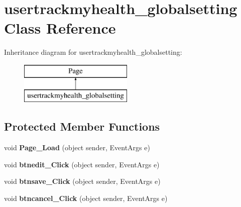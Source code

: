 \hypertarget{classusertrackmyhealth__globalsetting}{\section{usertrackmyhealth\-\_\-globalsetting Class Reference}
\label{classusertrackmyhealth__globalsetting}
}
Inheritance diagram for usertrackmyhealth\-\_\-globalsetting\-:\begin{figure}[H]
\begin{center}
\leavevmode
\includegraphics[height=2.000000cm]{classusertrackmyhealth__globalsetting}
\end{center}
\end{figure}
\subsection*{Protected Member Functions}
\begin{DoxyCompactItemize}
\item 
\hypertarget{classusertrackmyhealth__globalsetting_a52f59a33ef1aebafeb5c592ea8ac92ad}{void {\bfseries Page\-\_\-\-Load} (object sender, Event\-Args e)}\label{classusertrackmyhealth__globalsetting_a52f59a33ef1aebafeb5c592ea8ac92ad}

\item 
\hypertarget{classusertrackmyhealth__globalsetting_a7e42e773818fd700a00668fe65ab53cf}{void {\bfseries btnedit\-\_\-\-Click} (object sender, Event\-Args e)}\label{classusertrackmyhealth__globalsetting_a7e42e773818fd700a00668fe65ab53cf}

\item 
\hypertarget{classusertrackmyhealth__globalsetting_a0a41c47e1e4d02d158c18753b297eeae}{void {\bfseries btnsave\-\_\-\-Click} (object sender, Event\-Args e)}\label{classusertrackmyhealth__globalsetting_a0a41c47e1e4d02d158c18753b297eeae}

\item 
\hypertarget{classusertrackmyhealth__globalsetting_ad76c579b4a291caffbdea0185d7a1559}{void {\bfseries btncancel\-\_\-\-Click} (object sender, Event\-Args e)}\label{classusertrackmyhealth__globalsetting_ad76c579b4a291caffbdea0185d7a1559}

\end{DoxyCompactItemize}



